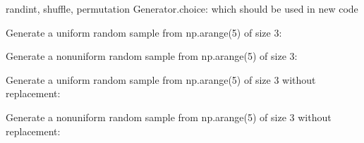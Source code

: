 \documentclass[letterpaper,10pt,english]{sphinxmanual}
\begin{document}
\begin{fulllineitems}
\begin{description}
\end{description}

randint, shuffle, permutation
Generator.choice: which should be used in new code

Generate a uniform random sample from np.arange(5) of size 3:

\begin{sphinxVerbatim}[commandchars=\\\{\}]
 
\end{sphinxVerbatim}

Generate a non\sphinxhyphen{}uniform random sample from np.arange(5) of size 3:

\begin{sphinxVerbatim}[commandchars=\\\{\}]
  \PYG{p}{[}    \PYG{p}{]}
\end{sphinxVerbatim}

Generate a uniform random sample from np.arange(5) of size 3 without
replacement:

\begin{sphinxVerbatim}[commandchars=\\\{\}]
  
\end{sphinxVerbatim}

Generate a non\sphinxhyphen{}uniform random sample from np.arange(5) of size
3 without replacement:

\begin{sphinxVerbatim}[commandchars=\\\{\}]
   \PYG{p}{[}    \PYG{p}{]}
\end{sphinxVerbatim}


\end{fulllineitems}
\end{document}
